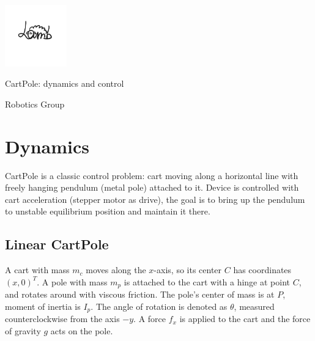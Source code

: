 \documentclass[12pt]{article}
\begin{document}
\begin{titlepage}
    \begin{center}
        \vspace*{0.1\paperheight}
        \includegraphics[width=0.20\textwidth]{logo.png} \par
        {\huge CartPole: dynamics and control \par}
        {\Large Robotics Group \par}
        \vspace*{\fill}
    \end{center}
 \end{titlepage}

\section{Dynamics}

CartPole is a classic control problem:
cart moving along a horizontal line with freely hanging pendulum (metal pole) attached to it.
Device is controlled with cart acceleration (stepper motor as drive),
the goal is to bring up the pendulum to unstable equilibrium position and maintain it there.

\subsection{Linear CartPole}

A cart with mass $m_c$ moves along the $x$-axis, so its center $C$ has coordinates $(x, 0)^T$.
A pole with mass $m_p$ is attached to the cart with a hinge at point $C$,
and rotates around with viscous friction.
The pole's center of mass is at $P$, moment of inertia is $I_p$.
The angle of rotation is denoted as $\theta$, measured counterclockwise from the axis $-y$.
A force $f_x$ is applied to the cart and the force of gravity $g$ acts on the pole.

\begin{center}
    \begin{adjustbox}{width=0.7\textwidth}
        
    \end{adjustbox}
\end{center}
\end{document}
